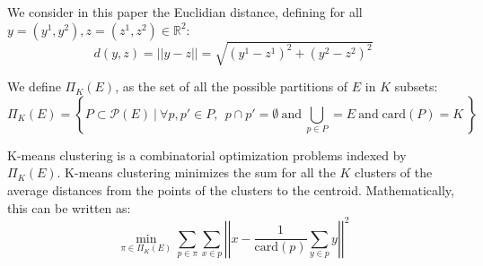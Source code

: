 \documentclass{meta}
\def\RR{{\mathbb{R}}}
\def\PP{{\mathcal{P}}}
\begin{document}



We consider in this paper the Euclidian distance, defining for all $ y=(y^1,y^2),z=(z^1,z^2) \in \RR^2$: 
\begin{equation}
d(y,z) = |\!| y -z |\!| = \sqrt{ \left(y^1 - z^1\right)^2 + \left(y^2 - z^2\right)^2}
\end{equation}




We define  $\Pi_K(E)$, as the set of all the possible partitions of $E$ in $K$ subsets:
\begin{equation}
\Pi_K(E) = \left\{P \subset \PP(E)\: \bigg| \:\forall p,p' \in P, \:\:p \cap p' =  \emptyset \: \mbox{and} \: \bigcup_{p \in P} = E \: \mbox{and} \; \mbox{card}(P)=K \: \right\} 
\end{equation}



K-means clustering  is a combinatorial optimization problems indexed by $\Pi_K(E)$.
K-means clustering minimizes the sum for all the $K$ clusters of the average distances from the points of the clusters to the centroid.
Mathematically, this can be written as:
\begin{equation}\label{defKmeans}
\min_{\pi \in \Pi_K(E)}  
\sum_{p \in \pi}  \sum_{x \in p} \left|\!\left| x - \frac 1 {\mbox{card}(p)} \sum_{y \in p} y \right|\!\right|^2
\end{equation}


% 
% 
% 
% 
% 
% 
% 
% 
% 
% 
% 
% 
% 
% 
%  
% 
% 
\end{document}
